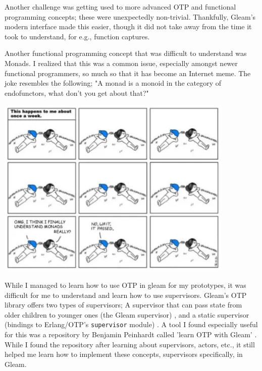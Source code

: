 \documentclass[]{final}
\begin{document}
Another challenge was getting used to more advanced OTP and functional
programming concepts; these were unexpectedly non-trivial.
Thankfully, Gleam's modern interface made this easier, though it did not take
away from the time it took to understand, for e.g., function captures.

\begin{minipage}{18em}
  Another functional programming concept that was difficult to understand was Monads.
  I realized that this was a common issue, especially amongst newer functional programmers,
  so much so that it has become an Internet meme. The joke resembles the following;
  "A monad is a monoid in the category of endofunctors, what don't you get about that?"
\end{minipage}
\hfill
\begin{minipage}{20em}
  \includegraphics[width=\linewidth]{monads.png}
\end{minipage}

While I managed to learn how to use OTP in gleam for my prototypes, it was
difficult for me to understand and learn how to use supervisors. Gleam's OTP
library offers two types of supervisors; A supervisor that can pass state from
older children to younger ones (the Gleam supervisor) \cite{noauthor_gleam/otp/supervisor_nodate},
and a static supervisor (bindings to Erlang/OTP’s \lstinline|supervisor| module) \cite{noauthor_gleam/otp/static_supervisor_nodate}.
A tool I found especially useful for this was a repository by Benjamin Peinhardt called 'learn OTP with Gleam' \cite{peinhardt_bcpeinhardt/learn_otp_with_gleam_2025}.
While I found the repository after learning about supervisors, actors, etc.,
it still helped me learn how to implement these concepts, supervisors
specifically, in Gleam.
\end{document}

